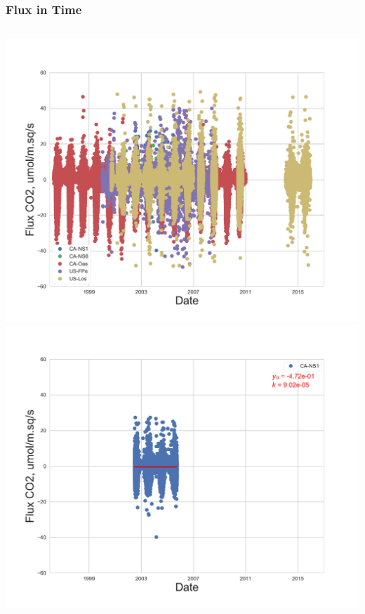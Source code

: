 \documentclass{beamer}
\begin{document}
\begin{frame}
\frametitle{Flux in Time}

\begin{columns}[t]
\centering
\includegraphics[width=\textwidth]{FvsTime/all.png}\\
\includegraphics[width=\textwidth]{FvsTime/CA-NS1.png}
\centering

\end{columns}
\end{frame}
\end{document}
